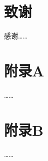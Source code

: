 \documentclass[unicode,bachelor]{seuthesis}
\begin{document}
\chapter{致谢}
感谢……



\begin{appendix}
  \chapter{附录A}
  ……

  \chapter{附录B}
  ……
\end{appendix}

\newpage
\printindex %
\end{document}
